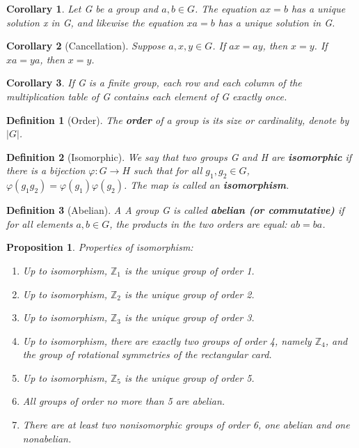 \documentclass[12pt]{article}
\newtheorem{definition}{Definition}[subsection]
\newtheorem{proposition}{Proposition}[subsection]
\newtheorem{corollary}{Corollary}[subsection]
\begin{document}
    \begin{corollary}
        Let G be a group and $a, b \in G$. The equation $ax=b$ has a unique solution x in G, and likewise the equation $xa = b$ has a unique solution in G.
    \end{corollary}
    
    \begin{corollary}[Cancellation]
        Suppose $a, x, y \in G$. If $ax = ay$, then $x = y$. If $xa = ya$, then $x = y$.
    \end{corollary}

    \begin{corollary}
        If G is a finite group, each row and each column of the multiplication table of G contains each element of G exactly once.
    \end{corollary}
    
    \begin{definition}[Order]
        The \textbf{order} of a group is its size or cardinality, denote by $|G|$.
    \end{definition}

    \begin{definition}[Isomorphic]
        We say that two groups G and H are \textbf{isomorphic} if there is a bijection $\varphi:G\rightarrow H$ such that for all $g_1, g_2 \in G$, $\varphi(g_1g_2) = \varphi(g_1)\varphi(g_2)$. The map is called an \textbf{isomorphism}.
    \end{definition}
    
    \begin{definition}[Abelian]
        A A group G is called \textbf{abelian (or commutative)} if for all elements $a, b \in G$, the products in the two orders are equal: $ab = ba$.
    \end{definition}
    
    \begin{proposition}
        Properties of isomorphism:
        \begin{enumerate}
            \item Up to isomorphism, $\mathbb{Z}_1$ is the unique group of order 1.
            \item Up to isomorphism, $\mathbb{Z}_2$ is the unique group of order 2.
            \item Up to isomorphism, $\mathbb{Z}_3$ is the unique group of order 3.
            \item Up to isomorphism, there are exactly two groups of order 4, namely $\mathbb{Z}_4$, and the group of rotational symmetries of the rectangular card.
            \item Up to isomorphism, $\mathbb{Z}_5$ is the unique group of order 5.
            \item All groups of order no more than 5 are abelian.
            \item There are at least two nonisomorphic groups of order 6, one
abelian and one nonabelian.
         \end{enumerate}
    \end{proposition}
    
\end{document}
